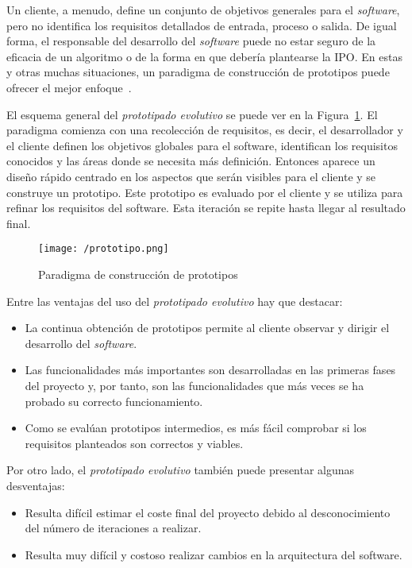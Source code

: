 Un cliente, a menudo, define un conjunto de objetivos generales para el \emph{software}, pero no
identifica los requisitos detallados de entrada, proceso o salida. De igual forma, el responsable
del desarrollo del \emph{software} puede no estar seguro de la eficacia de un algoritmo o de la
forma en que debería plantearse la \acs{IPO}. En estas y otras muchas situaciones, un paradigma de
construcción de prototipos puede ofrecer el mejor enfoque~\cite{Pressman10}.

El esquema general del \emph{prototipado evolutivo} se puede ver en la
Figura~\ref{fig:prototipo}. El paradigma comienza con una recolección de requisitos, es decir, el
desarrollador y el cliente definen los objetivos globales para el software, identifican los
requisitos conocidos y las áreas donde se necesita más definición. Entonces aparece un diseño rápido
centrado en los aspectos que serán visibles para el cliente y se construye un prototipo. Este
prototipo es evaluado por el cliente y se utiliza para refinar los requisitos del software. Esta
iteración se repite hasta llegar al resultado final.

\begin{figure}[!h]
  \begin{center}
    \texttt{[image: /prototipo.png]}
    \caption{Paradigma de construcción de prototipos}
    \label{fig:prototipo}
  \end{center}
\end{figure}

Entre las ventajas del uso del \emph{prototipado evolutivo} hay que destacar:

\begin{itemize}
  \item La continua obtención de prototipos permite al cliente observar y dirigir el desarrollo del
    \emph{software}.
  \item Las funcionalidades más importantes son desarrolladas en las primeras fases del proyecto y,
    por tanto, son las funcionalidades que más veces se ha probado su correcto funcionamiento.
  \item Como se evalúan prototipos intermedios, es más fácil comprobar si los requisitos planteados
    son correctos y viables.
\end{itemize}

Por otro lado, el \emph{prototipado evolutivo} también puede presentar algunas desventajas:

\begin{itemize}
  \item Resulta difícil estimar el coste final del proyecto debido al desconocimiento del número de
    iteraciones a realizar.
  \item Resulta muy difícil y costoso realizar cambios en la arquitectura del software.
\end{itemize}

